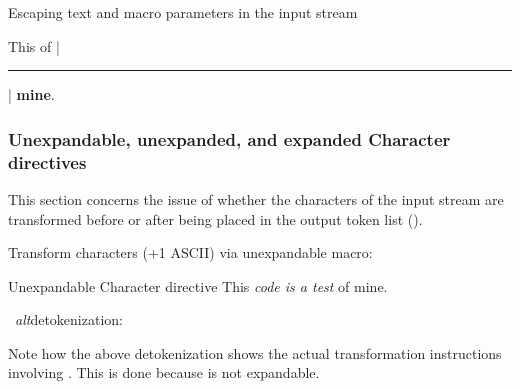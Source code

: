 \documentclass[10pt]{article}
\def\altdecytoks{\par\medskip\begingroup\noindent\macname{cytoks}
  \ \textit{alt}detokenization:\\\raggedright\footnotesize\ttfamily
  \expandafter\altdetokenize\expandafter{\the\cytoks}\normalsize\par
  \endgroup\medskip}
\begin{document}
\begin{exampleA}[lefthand width=5cm]{Escaping text and macro parameters 
  in the input stream}
\tokcycle
{}
{}
{}
{}
{This 
  of |\rule{1em}{.5em}|
  {\bfseries mine}.}
\the\cytoks
\end{exampleA}

\endgroup

\subsubsection{Unexpandable, unexpanded, and expanded Character 
  directives}

\begingroup
This section concerns the issue of whether the characters of the input
  stream are transformed before or after being placed in the 
  output token list ().

\medskip
\begin{minipage}[t]{\textwidth}
Transform characters (+1 ASCII) via unexpandable macro:\medskip

\begin{exampleA}[lefthand width=8.3cm]
  {Unexpandable Character directive}
\tokcycle
{}
{}
{}
{}{%
  This \textit{code \textup{is} a test} of mine.}
\the\cytoks
\end{exampleA}

\altdecytoks

Note how the above detokenization shows the actual transformation
  instructions involving .
This is done because  is not expandable.
\end{minipage}

\par\noindent\hrulefill\medskip
\endgroup
\end{document}
